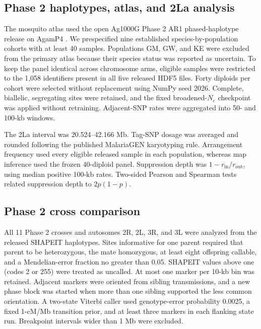 \subsection*{Phase 2 haplotypes, atlas, and 2La analysis}

The mosquito atlas used the open Ag1000G Phase 2 AR1 phased-haplotype release on AgamP4 \citep{malariagen_phase2_ar1_2017,ag1000g2020}. We prespecified nine established species-by-population cohorts with at least 40 samples. Populations GM, GW, and KE were excluded from the primary atlas because their species status was reported as uncertain. To keep the panel identical across chromosome arms, eligible samples were restricted to the 1,058 identifiers present in all five released HDF5 files. Forty diploids per cohort were selected without replacement using NumPy seed 2026. Complete, biallelic, segregating sites were retained, and the fixed broadened-\(N_e\) checkpoint was applied without retraining. Adjacent-SNP rates were aggregated into 50- and 100-kb windows.

The 2La interval was 20.524--42.166 Mb. Tag-SNP dosage was averaged and rounded following the published MalariaGEN karyotyping rule. Arrangement frequency used every eligible released sample in each population, whereas map inference used the frozen 40-diploid panel. Suppression depth was \(1-r_{\mathrm{in}}/r_{\mathrm{out}}\), using median positive 100-kb rates. Two-sided Pearson and Spearman tests related suppression depth to \(2p(1-p)\).

\subsection*{Phase 2 cross comparison}

All 11 Phase 2 crosses and autosomes 2R, 2L, 3R, and 3L were analyzed from the released SHAPEIT haplotypes. Sites informative for one parent required that parent to be heterozygous, the mate homozygous, at least eight offspring callable, and a Mendelian-error fraction no greater than 0.05. SHAPEIT values above one (codes 2 or 255) were treated as uncalled. At most one marker per 10-kb bin was retained. Adjacent markers were oriented from sibling transmissions, and a new phase block was started when more than one sibling supported the less common orientation. A two-state Viterbi caller used genotype-error probability 0.0025, a fixed 1-cM/Mb transition prior, and at least three markers in each flanking state run. Breakpoint intervals wider than 1 Mb were excluded.

